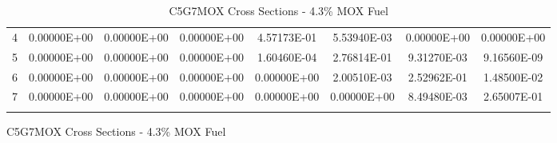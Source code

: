 \begin{figure}
\begin{table}[H]
\begin{subtable}[h]{1.0\textwidth}
{\begin{tabular}{*8c}
4 & 0.00000E+00	 &	0.00000E+00 &	0.00000E+00 &	4.57173E-01 &	5.53940E-03 &	0.00000E+00 &	0.00000E+00 \\
5 & 0.00000E+00	 &	0.00000E+00 &	0.00000E+00 &	1.60460E-04 &	2.76814E-01 &	9.31270E-03 &	9.16560E-09 \\
6 & 0.00000E+00	 &	0.00000E+00 &	0.00000E+00 &	0.00000E+00 &	2.00510E-03 &	2.52962E-01 &	1.48500E-02 \\
7 & 0.00000E+00	 &	0.00000E+00 &	0.00000E+00 &	0.00000E+00 &	0.00000E+00 &	8.49480E-03 &	2.65007E-01 \\
        \bottomrule
        & & & & & & & 
    \end{tabular}}
  \end{subtable}
    \caption{C5G7MOX Cross Sections - 4.3\% MOX Fuel}
\end{table}
\end{figure}

